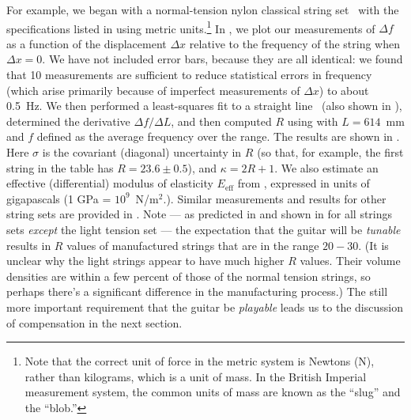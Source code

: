 For example, we began with a normal-tension nylon classical string set~\cite{ref:daddariostcweb} with the specifications listed in  using metric units.\footnote{Note that the correct unit of force in the metric system is Newtons (N), rather than kilograms, which is a unit of mass. In the British Imperial measurement system, the common units of mass are known as the ``slug'' and the ``blob.''} In , we plot our measurements of $\Delta f$ as a function of the displacement $\Delta x$ relative to the frequency of the string when $\Delta x = 0$. We have not included error bars, because they are all identical: we found that 10 measurements are sufficient to reduce statistical errors in frequency (which arise primarily because of imperfect measurements of $\Delta x$) to about 0.5~Hz. We then performed a least-squares fit to a straight line~\cite{ref:bevington2003dre} (also shown in ), determined the derivative $\Delta f / \Delta L$, and then computed $R$ using  with $L = 614$~mm and $f$ defined as the average frequency over the range. The results are shown in . Here $\sigma$ is the covariant (diagonal) uncertainty in $R$ (so that, for example, the first string in the table has $R = 23.6 \pm 0.5$), and $\kappa = 2 R + 1$. We also estimate an effective (differential) modulus of elasticity $E_\mathrm{eff}$ from , expressed in units of gigapascals (1 GPa = $10^9$~N/m$^2$.). Similar measurements and results for other string sets are provided in . Note --- as predicted in  and shown in  for all strings sets \emph{except} the light tension set --- the expectation that the guitar will be \emph{tunable} results in $R$ values of manufactured strings that are in the range $20 - 30$. (It is unclear why the light strings appear to have much higher $R$ values. Their volume densities are within a few percent of those of the normal tension strings, so perhaps there's a significant difference in the manufacturing process.) The still more important requirement that the guitar be \emph{playable} leads us to the discussion of compensation in the next section.

